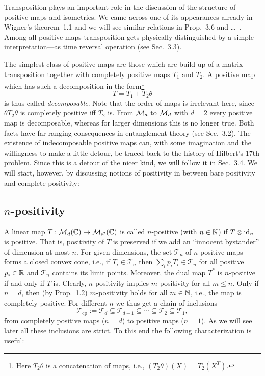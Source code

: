 \documentclass[11pt,a4paper]{article}
\numberwithin{equation}{section}
\begin{document}
Transposition plays an important role in the discussion of the structure of positive maps and
isometries. We came across one of its appearances already in Wigner's theorem~1.1 and we will see
similar relations in Prop.~3.6 and \dots\ . Among all positive maps transposition gets physically
distinguished by a simple interpretation---as time reversal operation (see Sec.~3.3).

The simplest class of positive maps are those which are build up of a matrix transposition
together with completely positive maps $T_1$ and $T_2$. A positive map which has such a
decomposition in the form\footnote{Here $T_2\theta$ is a concatenation of maps, i.e.,
    $(T_2\theta)(X)=T_2(X^T)$.}
\begin{equation}\label{eq:ch3:3.2}
    T = T_1 + T_2\theta
\end{equation}
is thus called \emph{decomposable}. Note that the order of maps is irrelevant here, since
$\theta T_2\theta$ is completely positive iff $T_2$ is. From $\mathcal{M}_d$ to $\mathcal{M}_d$ with $d=2$ every
positive map is decomposable, whereas for larger dimensions this is no longer true. Both facts have
far-ranging consequences in entanglement theory (see Sec.~3.2). The existence of indecomposable
positive maps can, with some imagination and the willingness to make a little detour, be traced
back to the history of Hilbert's 17th problem. Since this is a detour of the nicer kind, we will
follow it in Sec.~3.4. We will start, however, by discussing notions of positivity in between
bare positivity and complete positivity:

\subsection{$n$-positivity}

A linear map $T:\mathcal{M}_d(\mathbb{C})\to \mathcal{M}_{d'}(\mathbb{C})$ is called $n$-positive (with $n\in\mathbb{N}$) if $T\otimes \mathrm{id}_n$
is positive. That is, positivity of $T$ is preserved if we add an ``innocent bystander''
of dimension at most $n$. For given dimensions, the set $\mathcal{T}_n$ of $n$-positive maps
forms a closed convex cone, i.e., if $T_i\in \mathcal{T}_n$ then $\sum_i p_i T_i\in \mathcal{T}_n$
for all positive $p_i\in\mathbb{R}$ and $\mathcal{T}_n$ contains its limit points. Moreover, the dual map
$T^*$ is $n$-positive if and only if $T$ is. Clearly, $n$-positivity implies $m$-positivity for all
$m\le n$. Only if $n=d$, then (by Prop.~1.2) $m$-positivity holds for all $m\in\mathbb{N}$, i.e., the map is
completely positive. For different $n$ we thus get a chain of inclusions
\begin{equation}\label{eq:ch3:3.3}
    \mathcal{T}_{\mathrm{cp}} := \mathcal{T}_d \subseteq \mathcal{T}_{d-1}\subseteq \cdots \subseteq \mathcal{T}_2 \subseteq \mathcal{T}_1,
\end{equation}
from completely positive maps ($n=d$) to positive maps ($n=1$). As we will see later all these inclusions
are strict. To this end the following characterization is useful:
\end{document}
